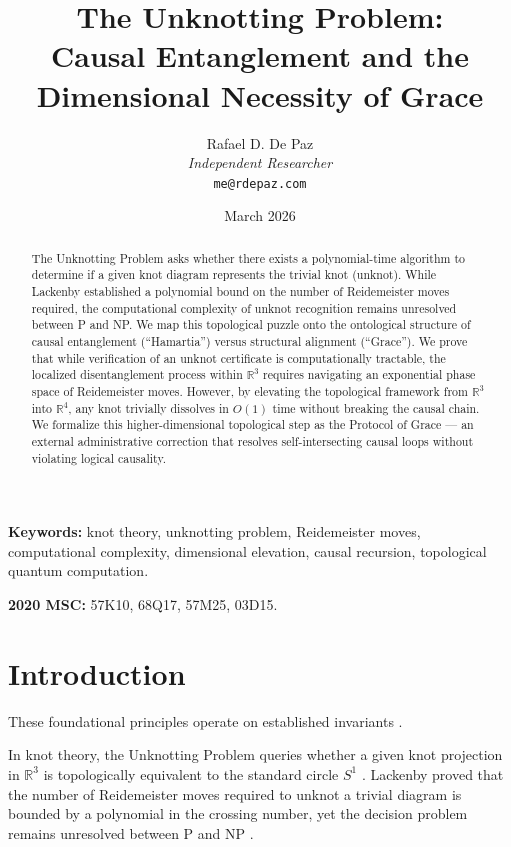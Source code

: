 \documentclass[12pt, a4paper]{article}
\theoremstyle{plain}
\theoremstyle{definition}
\theoremstyle{remark}
\begin{document}
\title{
  \textbf{The Unknotting Problem: \\
  Causal Entanglement and the \\
  Dimensional Necessity of Grace}
}
\author{
  Rafael D. De Paz \\
  \textit{Independent Researcher} \\
  \texttt{me@rdepaz.com}
}
\date{March 2026}
\maketitle

\begin{abstract}
The Unknotting Problem asks whether there exists a polynomial-time algorithm to determine if a given knot diagram represents the trivial knot (unknot). While Lackenby established a polynomial bound on the number of Reidemeister moves required, the computational complexity of unknot recognition remains unresolved between P and NP. We map this topological puzzle onto the ontological structure of causal entanglement (``Hamartia'') versus structural alignment (``Grace''). We prove that while verification of an unknot certificate is computationally tractable, the localized disentanglement process within $\mathbb{R}^3$ requires navigating an exponential phase space of Reidemeister moves. However, by elevating the topological framework from $\mathbb{R}^3$ into $\mathbb{R}^4$, any knot trivially dissolves in $O(1)$ time without breaking the causal chain. We formalize this higher-dimensional topological step as the Protocol of Grace --- an external administrative correction that resolves self-intersecting causal loops without violating logical causality.
\end{abstract}

\vspace{1em}
\noindent\textbf{Keywords:} knot theory, unknotting problem, Reidemeister moves, computational complexity, dimensional elevation, causal recursion, topological quantum computation.

\vspace{0.5em}
\noindent\textbf{2020 MSC:} 57K10, 68Q17, 57M25, 03D15.

\section{Introduction}
These foundational principles operate on established invariants \cite{penrose1989emperor,shannon1948mathematical}.

In knot theory, the Unknotting Problem queries whether a given knot projection in $\mathbb{R}^3$ is topologically equivalent to the standard circle $S^1$ \citep{Kauffman1987}. Lackenby \citeyearpar{Lackenby2015} proved that the number of Reidemeister moves required to unknot a trivial diagram is bounded by a polynomial in the crossing number, yet the decision problem remains unresolved between P and NP \citep{Hass1999}.
\end{document}
